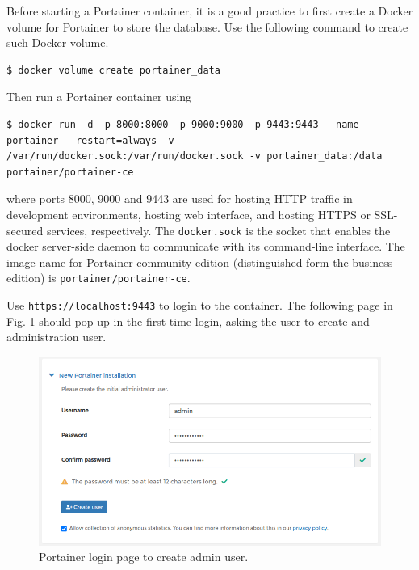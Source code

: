 Before starting a Portainer container, it is a good practice to first create a Docker volume for Portainer to store the database. Use the following command to create such Docker volume.
\begin{lstlisting}
$ docker volume create portainer_data
\end{lstlisting}
Then run a Portainer container using
\begin{lstlisting}
$ docker run -d -p 8000:8000 -p 9000:9000 -p 9443:9443 --name portainer --restart=always -v /var/run/docker.sock:/var/run/docker.sock -v portainer_data:/data portainer/portainer-ce
\end{lstlisting}
where ports 8000, 9000 and 9443 are used for hosting HTTP traffic in development environments, hosting web interface, and hosting HTTPS or SSL-secured services, respectively. The \verb|docker.sock| is the socket that enables the docker server-side daemon to communicate with its command-line interface. The image name for Portainer community edition (distinguished form the business edition) is \verb|portainer/portainer-ce|.

Use \verb|https://localhost:9443| to login to the container. The following page in Fig. \ref{ch:vac:fig:portainerlogin} should pop up in the first-time login, asking the user to create and administration user.
\begin{figure}[htbp]
	\centering
	\includegraphics[width=350pt]{chapters/ch-virtualization-and-containerization/figures/portainerlogin.png}
	\caption{Portainer login page to create admin user.} \label{ch:vac:fig:portainerlogin}
\end{figure}

